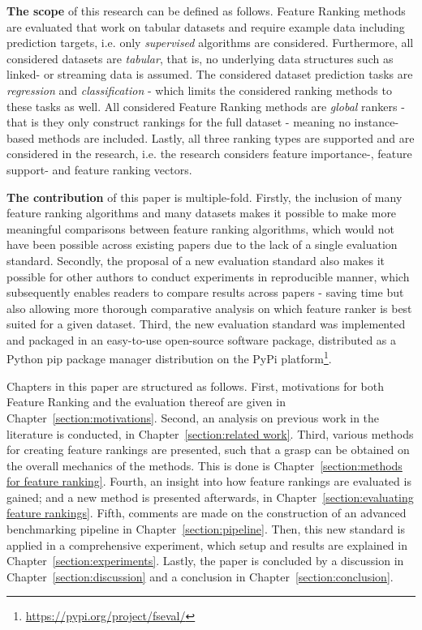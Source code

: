 \documentclass{article}
\begin{document}
\textbf{The scope} of this research can be defined as follows. Feature Ranking methods are evaluated that work on tabular datasets and require example data including prediction targets, i.e. only \textit{supervised} algorithms are considered. Furthermore, all considered datasets are \textit{tabular}, that is, no underlying data structures such as linked- or streaming data is assumed. The considered dataset prediction tasks are \textit{regression} and \textit{classification} - which limits the considered ranking methods to these tasks as well. All considered Feature Ranking methods are \textit{global} rankers - that is they only construct rankings for the full dataset - meaning no instance-based methods are included. Lastly, all three ranking types are supported and are considered in the research, i.e. the research considers feature importance-, feature support- and feature ranking vectors.

\textbf{The contribution} of this paper is multiple-fold. Firstly, the inclusion of many feature ranking algorithms and many datasets makes it possible to make more meaningful comparisons between feature ranking algorithms, which would not have been possible across existing papers due to the lack of a single evaluation standard. Secondly, the proposal of a new evaluation standard also makes it possible for other authors to conduct experiments in reproducible manner, which subsequently enables readers to compare results across papers - saving time but also allowing more thorough comparative analysis on which feature ranker is best suited for a given dataset. Third, the new evaluation standard was implemented and packaged in an easy-to-use open-source software package, distributed as a Python  pip package manager distribution on the PyPi platform\footnote{\href{https://pypi.org/project/fseval/}{https://pypi.org/project/fseval/}}.

Chapters in this paper are structured as follows. First, motivations for both Feature Ranking and the evaluation thereof are given in Chapter~\ref{section:motivations}. Second, an analysis on previous work in the literature is conducted, in Chapter~\ref{section:related work}. Third, various methods for creating feature rankings are presented, such that a grasp can be obtained on the overall mechanics of the methods. This is done is Chapter~\ref{section:methods for feature ranking}. Fourth, an insight into how feature rankings are evaluated is gained; and a new method is presented afterwards, in Chapter~\ref{section:evaluating feature rankings}. Fifth, comments are made on the construction of an advanced benchmarking pipeline in Chapter~\ref{section:pipeline}. Then, this new standard is applied in a comprehensive experiment, which setup and results are explained in Chapter~\ref{section:experiments}. Lastly, the paper is concluded by a discussion in Chapter~\ref{section:discussion} and a conclusion in Chapter~\ref{section:conclusion}.
\end{document}
